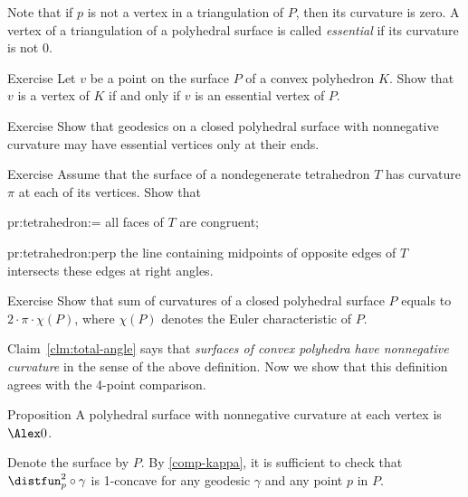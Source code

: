 Note that if $p$ is not a vertex in a triangulation of $P$, then its curvature is zero.
A vertex of a triangulation of a polyhedral surface is called \emph{essential} if its curvature is not $0$.

\begin{thm}{Exercise}\label{ex:vertex-essential-vertex}
Let $v$ be a point on the surface $P$ of a convex polyhedron $K$.
Show that $v$ is a vertex of $K$ if and only if
$v$ is an essential vertex of $P$.
\end{thm}


\begin{thm}{Exercise}\label{ex:geodesic-vertex}
Show that geodesics on a closed polyhedral surface with nonnegative curvature may have essential vertices only at their ends.
\end{thm}

\begin{thm}{Exercise}\label{pr:tetrahedron}
Assume that the surface of a nondegenerate tetrahedron $T$ has curvature $\pi$ at each of its vertices.
Show that

\begin{subthm}{pr:tetrahedron:=}
all faces of $T$ are congruent;
\end{subthm}

\begin{subthm}{pr:tetrahedron:perp} the line containing midpoints of opposite edges of $T$ intersects these edges at right angles.
\end{subthm}

\end{thm}

\begin{thm}{Exercise}\label{ex:gauss-bonnet}
Show that sum of curvatures of a closed polyhedral surface $P$ equals to $2\cdot\pi\cdot\chi(P)$,
where $\chi(P)$ denotes the Euler characteristic of $P$.
\end{thm}


Claim~\ref{clm:total-angle} says that \textit{surfaces of convex polyhedra have nonnegative curvature} in the sense of the above definition.
Now we show that this definition agrees with the 4-point comparison.

\begin{thm}{Proposition}\label{prop:poly-CBB}
A polyhedral surface with nonnegative curvature at each vertex is $\Alex0$.
\end{thm}

Denote the surface by $P$.
By \ref{comp-kappa}, it is sufficient to check that
$\distfun_p^2\circ\gamma$ is 1-concave for any geodesic $\gamma$ and any point $p$ in $P$.

